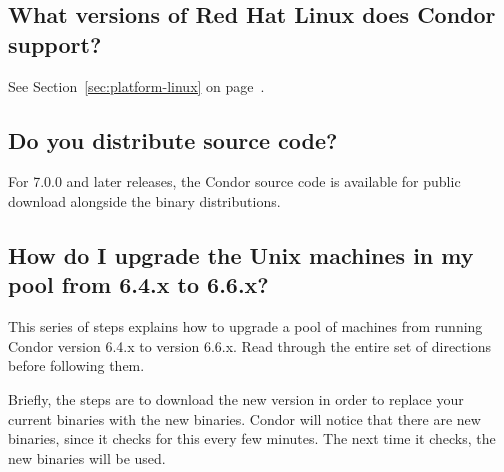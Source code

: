 \subsection*{What versions of Red Hat Linux does Condor support?}

See Section~\ref{sec:platform-linux} on
page~\pageref{sec:platform-linux}. 

\subsection*{Do you distribute source code?}

For 7.0.0 and later releases, the Condor source code is available for 
public download alongside the binary distributions.

\subsection*{How do I upgrade the Unix machines in my pool from 6.4.x to 6.6.x?}

This series of steps explains how to upgrade a pool of machines
from running Condor version 6.4.x to version 6.6.x.
Read through the entire set of directions before following
them.

Briefly, the steps are to download the new version in
order to replace your current binaries with the new binaries.
Condor will notice that there are new binaries, since
it checks for this every few minutes.
The next time it checks, the new binaries will be used.

